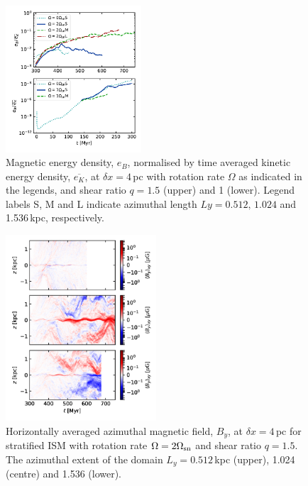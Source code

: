 \documentclass[iop,apj,numberedappendix,twocolappendix]{emulateapj}
\newcommand{\dx}{\delta x}
\begin{document}
\begin{figure}
\centering
\includegraphics[trim=0.0cm 0.0cm 0.0cm 0.0cm,clip=true,width=0.45\textwidth]{csc_figs/eB-res-4eta.pdf}
\caption{
Magnetic energy density, $e_B$, normalised by time averaged kinetic energy 
density, $\overline{e_K}$, at $\dx=4$\,pc with rotation rate $\Omega$ as
indicated in the legends, and shear ratio $q=1.5$ (upper) and 1 (lower). 
Legend labels S, M and L indicate azimuthal length $Ly=0.512,\,1.024$ and 
1.536\,kpc, respectively. 
\label{fig:lsd-eB}
}
\end{figure}

\begin{figure}
\centering
\includegraphics[trim=0.0cm 0.0cm 0.0cm 0.0cm,clip=true,width=0.5\textwidth]{csc_figs/av-bymzsm.pdf}
\caption{
Horizontally averaged azimuthal magnetic field, $B_y$, at $\dx=4$\,pc for 
stratified ISM with rotation rate $\Omega=2\Omega_{\rm sn}$ and shear ratio
$q=1.5$.
The azimuthal extent of the domain $L_y=0.512$\,kpc (upper), 1.024 (centre) 
and 1.536 (lower). 
\label{fig:lsd-bymz}
}
\end{figure}
\end{document}
